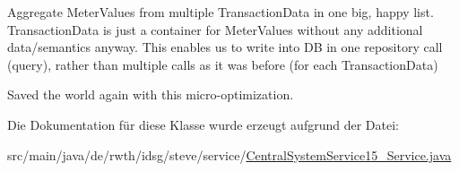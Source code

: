 Aggregate Meter\-Values from multiple Transaction\-Data in one big, happy list. Transaction\-Data is just a container for Meter\-Values without any additional data/semantics anyway. This enables us to write into D\-B in one repository call (query), rather than multiple calls as it was before (for each Transaction\-Data)

Saved the world again with this micro-\/optimization.

Die Dokumentation für diese Klasse wurde erzeugt aufgrund der Datei\-:\begin{DoxyCompactItemize}
\item 
src/main/java/de/rwth/idsg/steve/service/\hyperlink{_central_system_service15___service_8java}{Central\-System\-Service15\-\_\-\-Service.\-java}\end{DoxyCompactItemize}
